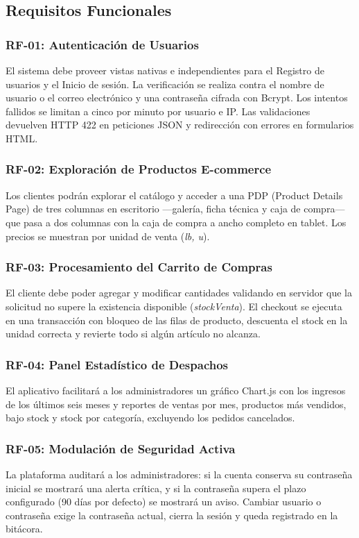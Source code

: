 \documentclass[12pt, a4paper]{article}
\begin{document}
\subsection{Requisitos Funcionales}

\subsubsection{RF-01: Autenticación de Usuarios}
El sistema debe proveer vistas nativas e independientes para el Registro de usuarios y el Inicio de sesión. La verificación se realiza contra el nombre de usuario o el correo electrónico y una contraseña cifrada con Bcrypt. Los intentos fallidos se limitan a cinco por minuto por usuario e IP. Las validaciones devuelven HTTP 422 en peticiones JSON y redirección con errores en formularios HTML.

\subsubsection{RF-02: Exploración de Productos E-commerce}
Los clientes podrán explorar el catálogo y acceder a una PDP (Product Details Page) de tres columnas en escritorio ---galería, ficha técnica y caja de compra--- que pasa a dos columnas con la caja de compra a ancho completo en tablet. Los precios se muestran por unidad de venta (\textit{lb, u}).

\subsubsection{RF-03: Procesamiento del Carrito de Compras}
El cliente debe poder agregar y modificar cantidades validando en servidor que la solicitud no supere la existencia disponible (\textit{stockVenta}). El checkout se ejecuta en una transacción con bloqueo de las filas de producto, descuenta el stock en la unidad correcta y revierte todo si algún artículo no alcanza.

\subsubsection{RF-04: Panel Estadístico de Despachos}
El aplicativo facilitará a los administradores un gráfico Chart.js con los ingresos de los últimos seis meses y reportes de ventas por mes, productos más vendidos, bajo stock y stock por categoría, excluyendo los pedidos cancelados.

\subsubsection{RF-05: Modulación de Seguridad Activa}
La plataforma auditará a los administradores: si la cuenta conserva su contraseña inicial se mostrará una alerta crítica, y si la contraseña supera el plazo configurado (90 días por defecto) se mostrará un aviso. Cambiar usuario o contraseña exige la contraseña actual, cierra la sesión y queda registrado en la bitácora.
\end{document}

